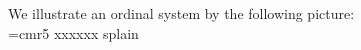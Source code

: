\documentclass[10pt]{article}
\begin{document}
We illustrate
an ordinal system by 
the following picture:\\
\font\thinlinefont=cmr5
%
\begingroup\makeatletter\ifx\SetFigFont\undefined
\def\x#1#2#3#4#5#6#7\relax{\def\x{#1#2#3#4#5#6}}%
\expandafter\x\fmtname xxxxxx\relax \def\y{splain}%
\ifx\x\y   %
\gdef\SetFigFont#1#2#3{%
  \ifnum #1<17\tiny\else \ifnum #1<20\small\else
  \ifnum #1<24\normalsize\else \ifnum #1<29\large\else
  \ifnum #1<34\Large\else \ifnum #1<41\LARGE\else
     \huge\fi\fi\fi\fi\fi\fi
  \csname #3\endcsname}%
\else
\gdef\SetFigFont#1#2#3{\begingroup
  \count@#1\relax \ifnum 25<\count@\count@25\fi
  \def\x{\endgroup\@setsize\SetFigFont{#2pt}}%
  \expandafter\x
    \csname \romannumeral\the\count@ pt\expandafter\endcsname
    \csname @\romannumeral\the\count@ pt\endcsname
  \csname #3\endcsname}%
\fi
\fi\endgroup
\end{document}

